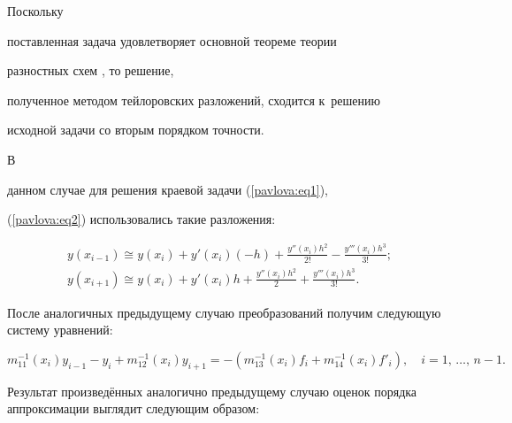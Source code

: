 \smallskip



 Поскольку

поставленная задача удовлетворяет основной теореме теории

разностных схем \cite[стр. 209]{pavlova:bib2}, то решение,

полученное методом тейлоровских разложений, сходится к~решению

исходной задачи со вторым порядком точности.



\smallskip



 В

данном случае для решения краевой задачи (\ref{pavlova:eq1}),

(\ref{pavlova:eq2}) использовались такие разложения:

\begin{gather*}

y(x_{i-1} )\cong y(x_i)+y'(x_i)(-h)+\frac{y''(x_i)h^2}{2!}-\frac{y'''(x_i)h^3}{3!}; \\

y(x_{i+1} )\cong y(x_i)+y'(x_i)h+\frac{y''(x_i )h^2}{2}+\frac{y'''(x_i)h^3}{3!}.

\end{gather*}

После аналогичных предыдущему случаю преобразований получим  следующую систему уравнений:

\[

m_{11}^{-1} (x_i)y_{i-1} - y_i +m_{12}^{-1} (x_i)y_{i+1} =-\left(m_{13}^{-1}

(x_i)f_i +m_{14}^{-1} (x_i)f'_i \right), \quad i=1,\,\ldots,\,n-1.

\]



Результат произведённых аналогично предыдущему случаю оценок порядка аппроксимации выглядит следующим образом:

